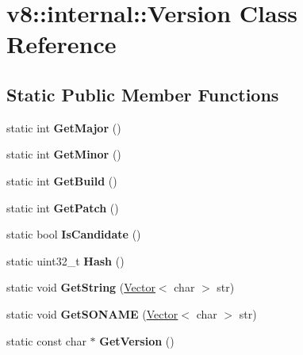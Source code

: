\hypertarget{classv8_1_1internal_1_1_version}{}\section{v8\+:\+:internal\+:\+:Version Class Reference}
\label{classv8_1_1internal_1_1_version}
\subsection*{Static Public Member Functions}
\begin{DoxyCompactItemize}
\item 
static int {\bfseries Get\+Major} ()\hypertarget{classv8_1_1internal_1_1_version_a3d8a7322a94b24a794e232e39a810532}{}\label{classv8_1_1internal_1_1_version_a3d8a7322a94b24a794e232e39a810532}

\item 
static int {\bfseries Get\+Minor} ()\hypertarget{classv8_1_1internal_1_1_version_a72873948c8d86b18bbf1059481259af8}{}\label{classv8_1_1internal_1_1_version_a72873948c8d86b18bbf1059481259af8}

\item 
static int {\bfseries Get\+Build} ()\hypertarget{classv8_1_1internal_1_1_version_a5fc1a8f4abe00d63ce6b1de28aa10623}{}\label{classv8_1_1internal_1_1_version_a5fc1a8f4abe00d63ce6b1de28aa10623}

\item 
static int {\bfseries Get\+Patch} ()\hypertarget{classv8_1_1internal_1_1_version_a60b6f29b460ab319280241a1b6273330}{}\label{classv8_1_1internal_1_1_version_a60b6f29b460ab319280241a1b6273330}

\item 
static bool {\bfseries Is\+Candidate} ()\hypertarget{classv8_1_1internal_1_1_version_ae62c0c059d688ed1b252311d319b56dd}{}\label{classv8_1_1internal_1_1_version_ae62c0c059d688ed1b252311d319b56dd}

\item 
static uint32\+\_\+t {\bfseries Hash} ()\hypertarget{classv8_1_1internal_1_1_version_ae10e2f0dadfb79d26242991536069390}{}\label{classv8_1_1internal_1_1_version_ae10e2f0dadfb79d26242991536069390}

\item 
static void {\bfseries Get\+String} (\hyperlink{classv8_1_1internal_1_1_vector}{Vector}$<$ char $>$ str)\hypertarget{classv8_1_1internal_1_1_version_aebe98dec5081ad84f4c539d5b5f661e0}{}\label{classv8_1_1internal_1_1_version_aebe98dec5081ad84f4c539d5b5f661e0}

\item 
static void {\bfseries Get\+S\+O\+N\+A\+ME} (\hyperlink{classv8_1_1internal_1_1_vector}{Vector}$<$ char $>$ str)\hypertarget{classv8_1_1internal_1_1_version_acd1702b2f55cc5b7955c03c4b56d813a}{}\label{classv8_1_1internal_1_1_version_acd1702b2f55cc5b7955c03c4b56d813a}

\item 
static const char $\ast$ {\bfseries Get\+Version} ()\hypertarget{classv8_1_1internal_1_1_version_a0e4c59ed561ad523f362ba1a5a9b2ca0}{}\label{classv8_1_1internal_1_1_version_a0e4c59ed561ad523f362ba1a5a9b2ca0}

\end{DoxyCompactItemize}
